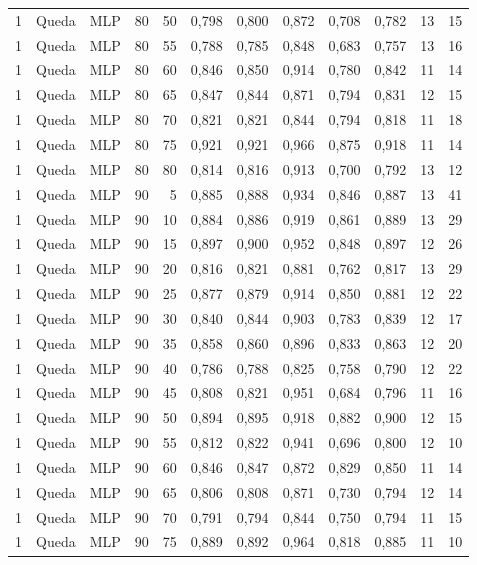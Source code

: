 \begin{longtable}{ccclrrrrrrrr}
1 & Queda & MLP & 80 & 50 & 0,798 & 0,800 & 0,872 & 0,708 & 0,782 & 13 & 15 \\
1 & Queda & MLP & 80 & 55 & 0,788 & 0,785 & 0,848 & 0,683 & 0,757 & 13 & 16 \\
1 & Queda & MLP & 80 & 60 & 0,846 & 0,850 & 0,914 & 0,780 & 0,842 & 11 & 14 \\
1 & Queda & MLP & 80 & 65 & 0,847 & 0,844 & 0,871 & 0,794 & 0,831 & 12 & 15 \\
1 & Queda & MLP & 80 & 70 & 0,821 & 0,821 & 0,844 & 0,794 & 0,818 & 11 & 18 \\
1 & Queda & MLP & 80 & 75 & 0,921 & 0,921 & 0,966 & 0,875 & 0,918 & 11 & 14 \\
1 & Queda & MLP & 80 & 80 & 0,814 & 0,816 & 0,913 & 0,700 & 0,792 & 13 & 12 \\
1 & Queda & MLP & 90 & 5 & 0,885 & 0,888 & 0,934 & 0,846 & 0,887 & 13 & 41 \\
1 & Queda & MLP & 90 & 10 & 0,884 & 0,886 & 0,919 & 0,861 & 0,889 & 13 & 29 \\
1 & Queda & MLP & 90 & 15 & 0,897 & 0,900 & 0,952 & 0,848 & 0,897 & 12 & 26 \\
1 & Queda & MLP & 90 & 20 & 0,816 & 0,821 & 0,881 & 0,762 & 0,817 & 13 & 29 \\
1 & Queda & MLP & 90 & 25 & 0,877 & 0,879 & 0,914 & 0,850 & 0,881 & 12 & 22 \\
1 & Queda & MLP & 90 & 30 & 0,840 & 0,844 & 0,903 & 0,783 & 0,839 & 12 & 17 \\
1 & Queda & MLP & 90 & 35 & 0,858 & 0,860 & 0,896 & 0,833 & 0,863 & 12 & 20 \\
1 & Queda & MLP & 90 & 40 & 0,786 & 0,788 & 0,825 & 0,758 & 0,790 & 12 & 22 \\
1 & Queda & MLP & 90 & 45 & 0,808 & 0,821 & 0,951 & 0,684 & 0,796 & 11 & 16 \\
1 & Queda & MLP & 90 & 50 & 0,894 & 0,895 & 0,918 & 0,882 & 0,900 & 12 & 15 \\
1 & Queda & MLP & 90 & 55 & 0,812 & 0,822 & 0,941 & 0,696 & 0,800 & 12 & 10 \\
1 & Queda & MLP & 90 & 60 & 0,846 & 0,847 & 0,872 & 0,829 & 0,850 & 11 & 14 \\
1 & Queda & MLP & 90 & 65 & 0,806 & 0,808 & 0,871 & 0,730 & 0,794 & 12 & 14 \\
1 & Queda & MLP & 90 & 70 & 0,791 & 0,794 & 0,844 & 0,750 & 0,794 & 11 & 15 \\
1 & Queda & MLP & 90 & 75 & 0,889 & 0,892 & 0,964 & 0,818 & 0,885 & 11 & 10 \\

\end{longtable}
